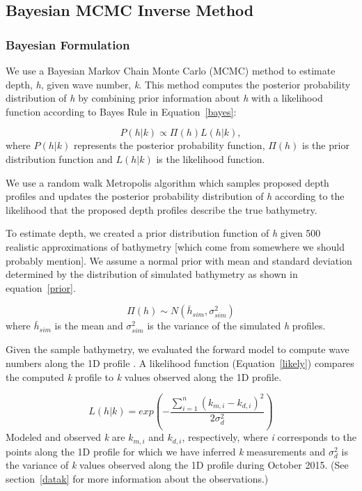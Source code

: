 \subsection{Bayesian MCMC Inverse Method}
\subsubsection{Bayesian Formulation}

We use a Bayesian Markov Chain Monte Carlo (MCMC) method to estimate depth, \textit{h}, given wave number, \textit{k}. %
This method computes the posterior probability distribution of \textit{h} by combining prior information about \textit{h} with a likelihood function according to Bayes Rule in Equation~\ref{bayes}: 


\begin{equation}\label{bayes}
P(h|%
k) \propto \Pi(h)L(h|%
k),
\end{equation} 
where $P(h|%
k)$ represents the posterior probability function, $\Pi(h)$ is the prior distribution function and $L(h|%
k)$ is the likelihood function.

We use a random walk Metropolis algorithm \citep{Metropolis1953} which samples proposed depth profiles and updates the posterior probability distribution of \textit{h} according to the likelihood that the proposed depth profiles describe the true bathymetry. 

To estimate depth, we created a prior distribution function of \textit{h} given 500 realistic approximations of bathymetry [which come from somewhere we should probably mention].  We assume a normal prior with mean and standard deviation determined by the distribution of simulated bathymetry as shown in equation~\ref{prior}. 

\begin{equation}\label{prior}
\Pi(h) \sim N(\bar{h}_{sim},\sigma_{sim}^2)
\end{equation}
where $\bar{h}_{sim}$ is the mean and $\sigma_{sim}^2$ is the variance of the simulated \textit{h} profiles. 

Given the sample bathymetry, we evaluated the forward model to compute wave numbers along the 1D profile%
. A likelihood function (Equation~\ref{likely}) compares the computed \textit{k} profile to \textit{k} values observed along the 1D profile. 

\begin{equation} \label{likely}
L(h|%
k)=exp(- \frac{\sum\limits_{i=1}^n({k}_{m,i}-k_{d,i})^2}{2\sigma_{d}^2})
\end{equation} 
Modeled and observed \textit{k} are ${k}_{m,i}$ and $k_{d,i}$, respectively, where \textit{i} corresponds to the points along the 1D profile for which we have inferred \textit{k} measurements and $\sigma_{d}^2$ is the variance of \textit{k} values observed along the 1D profile during October 2015. (See section~\ref{datak} for more information about the observations.) 

